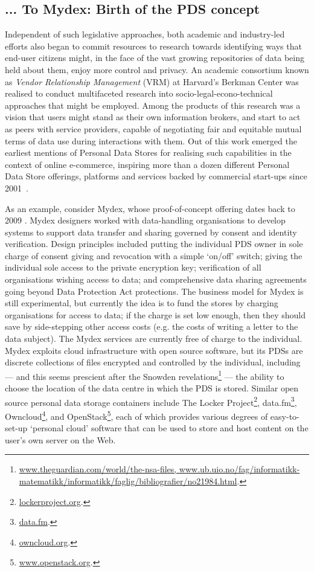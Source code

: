 \documentclass{acm_proc_article-sp}
\begin{document}
\subsection{... To Mydex: Birth of the PDS concept}

Independent of such legislative approaches, both academic and industry-led efforts also began to commit resources to research towards identifying ways that end-user citizens might, in the face of the vast growing repositories of data being held about them, enjoy more control and privacy. An academic consortium known as \emph{Vendor Relationship Management} (VRM) at Harvard's Berkman Center was realised to conduct multifaceted research into socio-legal-econo-technical approaches that might be employed.  Among the products of this research was a vision that users might stand as their own information brokers, and start to act as peers with service providers, capable of negotiating fair and equitable mutual terms of data use during interactions with them\cite{agustin2001vendor}.  Out of this work emerged the earliest mentions of Personal Data Stores for realising such capabilities in the context of online e-commerce, inspiring more than a dozen different Personal Data Store offerings, platforms and services backed by commercial start-ups since 2001~\cite{ctrlshift}. 

As an example, consider Mydex, whose proof-of-concept offering dates back to 2009 \cite{heath2013}. Mydex designers worked with data-handling organisations to develop systems to support data transfer and sharing governed by consent and identity verification. Design principles included putting the individual PDS owner in sole charge of consent giving and revocation with a simple `on/off’ switch; giving the individual sole access to the private encryption key; verification of all organisations wishing access to data; and comprehensive data sharing agreements going beyond Data Protection Act protections. The business model for Mydex is still experimental, but currently the idea is to fund the stores by charging organisations for access to data; if the charge is set low enough, then they should save by side-stepping other access costs (e.g. the costs of writing a letter to the data subject). The Mydex services are currently free of charge to the individual. Mydex exploits cloud infrastructure with open source software, but  its PDSs are discrete collections of files encrypted and controlled by the individual, including --- and this seems prescient after the Snowden revelations\footnote{\url{www.theguardian.com/world/the-nsa-files, www.ub.uio.no/fag/informatikk-matematikk/informatikk/faglig/bibliografier/no21984.html}.} --- the ability to choose the location of the data centre in which the PDS is stored. Similar open source personal data storage containers include The Locker Project\footnote{\url{lockerproject.org}.}, data.fm\footnote{\url{data.fm}.}, Owncloud\footnote{\url{owncloud.org}.}, and OpenStack\footnote{\url{www.openstack.org}.}, each of which provides various degrees of easy-to-set-up `personal cloud’ software that can be used to
store and host content on the user's own server on the Web.
\end{document}
